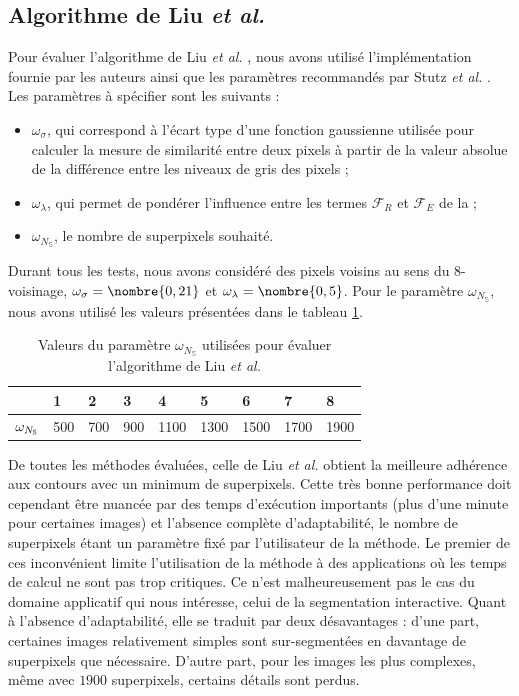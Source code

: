  \subsection{Algorithme de Liu \textit{et al.}}
 Pour évaluer l'algorithme de Liu \textit{et al.} \cite{liu2011entropy}, nous avons utilisé l'implémentation fournie par les auteurs ainsi que les paramètres recommandés par Stutz \textit{et al.} \cite{stutz2015superpixel}. Les paramètres à spécifier sont les suivants :
 \begin{itemize}
 \item $\omega_{\sigma}$, qui correspond à l'écart type d'une fonction gaussienne utilisée pour calculer la mesure de similarité entre deux pixels à partir de la valeur absolue de la différence entre les niveaux de gris des pixels ;
 \item $\omega_{\lambda}$, qui permet de pondérer l'influence entre les termes $\mathcal{F}_{R}$ et $\mathcal{F}_{E}$ de la  ;
 \item $\omega_{N_{\mathbb{S}}}$, le nombre de superpixels souhaité. 
 \end{itemize}
 

 Durant tous les tests, nous avons considéré des pixels voisins au sens du 8-voisinage, $\omega_{\sigma}=\nombre{0,21}$ et $\omega_{\lambda}=\nombre{0,5}$. Pour le paramètre $\omega_{N_{\mathbb{S}}}$, nous avons utilisé les valeurs présentées dans le tableau \ref{tab:sp:paramERS}.
 \begin{table}[htb]
 \caption{Valeurs du paramètre $\omega_{N_{\mathbb{S}}}$ utilisées pour évaluer l'algorithme de Liu \textit{et al.}}
\centering
\begin{tabular}{| l| l| l| l| l| l| l| l|  l|}
\hline
\cellcolor{gris}{Test} & 1 & 2 & 3 & 4 & 5 & 6&7 &8\\
\hline
$\cellcolor{gris}{\omega_{N_{\mathbb{S}}}}$ & 500 & 700 & 900 &1100 &1300 &1500&1700 &1900\\
\hline
\end{tabular}
\label{tab:sp:paramERS}
\end{table}

 
De toutes les méthodes évaluées, celle de Liu \textit{et al.} obtient la meilleure adhérence aux contours avec un minimum de superpixels. Cette très bonne performance doit cependant être nuancée par  des temps d'exécution importants (plus d'une minute pour certaines images) et l'absence complète d'adaptabilité, le nombre de superpixels étant un paramètre fixé par l'utilisateur de la méthode. Le premier de ces inconvénient limite l'utilisation de la méthode à des applications où les temps de calcul ne sont pas trop critiques. Ce n'est malheureusement pas le cas du domaine applicatif qui nous intéresse, celui de la segmentation interactive. Quant à l'absence d'adaptabilité, elle se traduit par deux désavantages : d'une part, certaines images relativement simples sont sur-segmentées en davantage de superpixels que nécessaire. D'autre part, pour les images les plus complexes, même avec $1900$ superpixels, certains détails sont perdus.
 
